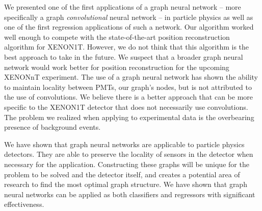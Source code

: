 We presented one of the first applications of a graph neural network -- more specifically a graph \textit{convolutional} neural network -- in particle physics as well as one of the first regression applications of such a network.
Our algorithm worked well enough to compete with the state-of-the-art position reconstruction algorithm for XENON1T.
However, we do not think that this algorithm is the best approach to take in the future.
We suspect that a broader graph neural network would work better for position reconstruction for the upcoming XENONnT experiment.
The use of a graph neural network has shown the ability to maintain locality between PMTs, our graph's nodes, but is not attributed to the use of convolutions.
We believe there is a better approach that can be more specific to the XENON1T detector that does not necessarily use convolutions.
The problem we realized when applying to experimental data is the overbearing presence of background events.

\par We have shown that graph neural networks are applicable to particle physics detectors.
They are able to preserve the locality of sensors in the detector when necessary for the application.
Constructing these graphs will be unique for the problem to be solved and the detector itself, and creates a potential area of research to find the most optimal graph structure.
We have shown that graph neural networks can be applied as both classifiers and regressors with significant effectiveness.
